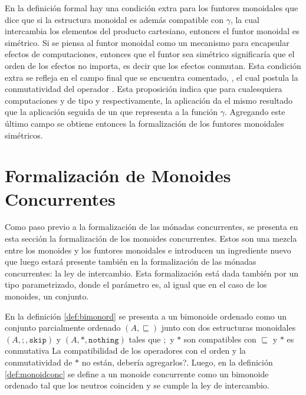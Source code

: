 En la definición formal hay una condición extra para los funtores monoidales que dice que si la estructura monoidal es además compatible con $\gamma$, la cual intercambia los elementos del producto cartesiano, entonces el funtor monoidal es simétrico. Si se piensa al funtor monoidal como un mecanismo para encapsular efectos de computaciones, entonces que el funtor sea simétrico significaría que el orden de los efectos no importa, es decir que los efectos conmutan. Esta condición extra se refleja en el campo final que se encuentra comentado, , el cual postula la conmutatividad del operador . Esta proposición indica que para cualesquiera computaciones  y  de tipo  y  respectivamente, la aplicación   da el mismo resultado que la aplicación   seguida de un  que representa a la función $\gamma$. Agregando este último campo se obtiene entonces la formalización de los funtores monoidales simétricos.

\section{Formalización de Monoides Concurrentes}\label{form:monoidconc}

Como paso previo a la formalización de las mónadas concurrentes, se presenta en esta sección la formalización de los monoides concurrentes. Estos son una mezcla entre los monoides y los funtores monoidales e introducen un ingrediente nuevo que luego estará presente también en la formalización de las mónadas concurrentes: la ley de intercambio. Esta formalización está dada también por un tipo  parametrizado, donde el parámetro es, al igual que en el caso de los monoides, un conjunto. 


En la definición \ref{def:bimonord} se presenta a un bimonoide ordenado como un conjunto parcialmente ordenado $(A,\sqsubseteq)$ junto con dos estructuras monoidales $(A,;,\mathtt{skip})$ y $(A,*,\mathtt{nothing})$ tales que $;$ y $*$ son compatibles con $\sqsubseteq$ y $*$ es conmutativa {\color{red} La compatibilidad de los operadores con el orden y la conmutatividad de $*$ no están, debería agregarlos?}. Luego, en la definición \ref{def:monoidconc} se define a un monoide concurrente como un bimonoide ordenado tal que los neutros coinciden y se cumple la ley de intercambio.

